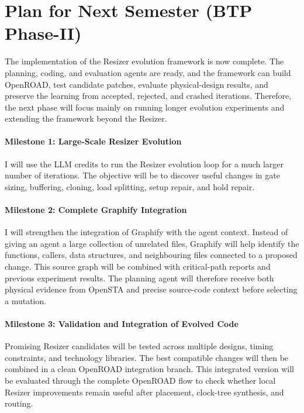 \documentclass[10pt, conference]{IEEEtran}
\begin{document}
\section{Plan for Next Semester (BTP Phase-II)}
\label{sec:roadmap}

The implementation of the Resizer evolution framework is now complete. The planning, coding, and evaluation agents are ready, and the framework can build OpenROAD, test candidate patches, evaluate physical-design results, and preserve the learning from accepted, rejected, and crashed iterations. Therefore, the next phase will focus mainly on running longer evolution experiments and extending the framework beyond the Resizer.

\paragraph{Milestone 1: Large-Scale Resizer Evolution}
I will use the LLM credits to run the Resizer evolution loop for a much larger number of iterations. The objective will be to discover useful changes in gate sizing, buffering, cloning, load splitting, setup repair, and hold repair.

\paragraph{Milestone 2: Complete Graphify Integration}
I will strengthen the integration of Graphify with the agent context. Instead of giving an agent a large collection of unrelated files, Graphify will help identify the functions, callers, data structures, and neighbouring files connected to a proposed change. This source graph will be combined with critical-path reports and previous experiment results. The planning agent will therefore receive both physical evidence from OpenSTA and precise source-code context before selecting a mutation.

\paragraph{Milestone 3: Validation and Integration of Evolved Code}
Promising Resizer candidates will be tested across multiple designs, timing constraints, and technology libraries. The best compatible changes will then be combined in a clean OpenROAD integration branch. This integrated version will be evaluated through the complete OpenROAD flow to check whether local Resizer improvements remain useful after placement, clock-tree synthesis, and routing.
\end{document}

